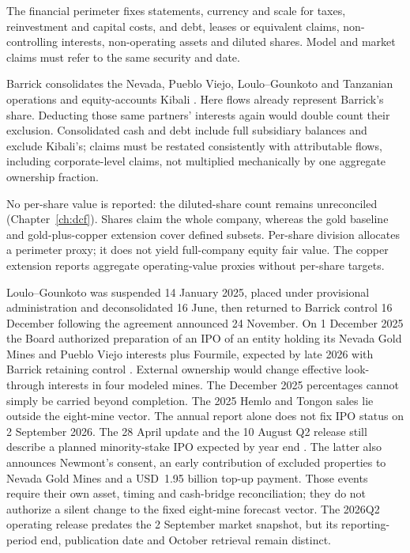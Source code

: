 The financial perimeter fixes statements, currency and scale for taxes,
reinvestment and capital costs, and debt, leases or equivalent claims,
non-controlling interests, non-operating assets and diluted shares. Model and
market claims must refer to the same security and date.

Barrick consolidates the Nevada, Pueblo Viejo, Loulo--Gounkoto and Tanzanian
operations and equity-accounts Kibali \cite{barrick-ar-2025}. Here flows
already represent Barrick's share. Deducting those same partners' interests
again would double count their exclusion. Consolidated cash and debt include
full subsidiary balances and exclude Kibali's; claims must be restated
consistently with attributable flows, including corporate-level claims,
not multiplied mechanically by one aggregate ownership fraction.

No per-share value is reported: the diluted-share count remains unreconciled
(Chapter~\ref{ch:dcf}).
Shares claim the whole company, whereas the gold baseline and gold-plus-copper
extension cover defined subsets. Per-share division allocates a
perimeter proxy; it does not yield full-company equity fair value. The copper
extension reports aggregate operating-value proxies without per-share targets.

Loulo--Gounkoto was suspended 14 January 2025, placed under provisional
administration and deconsolidated 16 June, then returned to Barrick control
16 December following the agreement announced 24 November. On 1 December
2025 the Board authorized preparation of an IPO of an entity holding its
Nevada Gold Mines and Pueblo Viejo interests plus Fourmile, expected by late
2026 with Barrick retaining control \cite{barrick-ar-2025}. External ownership
would change effective look-through interests in four modeled mines. The
December 2025 percentages cannot simply be carried beyond completion.
The 2025 Hemlo and Tongon sales lie outside the eight-mine vector.
The annual report alone does not fix IPO status on 2 September 2026.
The 28 April update and the 10 August Q2 release still describe a planned
minority-stake IPO expected by year end \cite{barrick-ipo-2026,barrick-q2-release-2026}.
The latter also announces Newmont's consent, an early contribution of excluded
properties to Nevada Gold Mines and a USD~1.95 billion top-up payment. Those
events require their own asset, timing and cash-bridge reconciliation; they
do not authorize a silent change to the fixed eight-mine forecast vector.
The 2026Q2 operating release predates the 2 September market snapshot, but its
reporting-period end, publication date and October retrieval remain distinct.


